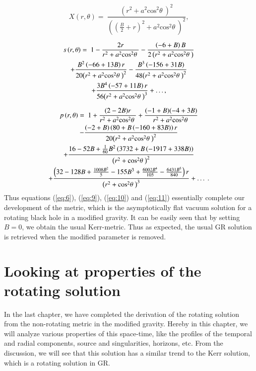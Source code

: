 \documentclass[12pt,a4paper,oneside]{book}
\newcommand{\eq}[2]{\begin{equation} \label{eq:#1} #2 \end{equation}}
\newcommand{\meq}[2]{\begin{multline}\label{eq:#1} #2 \end{multline}}
\newcommand{\Eref}[1]{(\ref{eq:#1})}
\begin{document}
\eq{9}{X\left(r,\theta \right)=\ \frac{{(r^2+a^2{{\mathrm{cos}}^{\mathrm{2}} \theta \ })}^2}{{\left({\left(\frac{B}{2}+r\right)}^2+a^2{{\mathrm{cos}}^{\mathrm{2}} \theta \ }\right)}^2},}

\meq{10}{s\left(r,\theta \right)=\ 1-\frac{2r}{r^2+a^2{{\mathrm{cos}}^{\mathrm{2}} \theta \ }}-\frac{\left(-6+B\right)B}{2\left(r^2+a^2{{\mathrm{cos}}^{\mathrm{2}} \theta \ }\right)}\cr+\frac{B^2\left(-66+13B\right)r}{20{\left(r^2+a^2{{\mathrm{cos}}^{\mathrm{2}} \theta \ }\right)}^2}
-\frac{B^3\left(-156+31B\right)}{48{\left(r^2+a^2{{\mathrm{cos}}^{\mathrm{2}} \theta \ }\right)}^2}\cr+\frac{3B^4\left(-57+11B\right)r}{56{\left(r^2+a^2{{\mathrm{cos}}^{\mathrm{2}} \theta \ }\right)}^3}+\dots,}

\meq{11}{p\left(r,\theta \right)=\ 1+\frac{(2-2B)r}{r^2+a^2{{\mathrm{cos}}^{\mathrm{2}} \theta \ }}+\frac{(-1+B)(-4+3B)}{r^2+a^2{{\mathrm{cos}}^{\mathrm{2}} \theta \ }}\cr-\frac{\left(-2+B\right)\left(80+B\left(-160+83B\right)\right)r}{20{\left(r^2+a^2{{\mathrm{cos}}^{\mathrm{2}} \theta \ }\right)}^2}
\cr+\frac{16-52B+\frac{1}{60}B^2\left(3732+B\left(-1917+338B\right)\right)}{{\left(r^2+{{\mathrm{cos}}^{\mathrm{2}} \theta \ }\right)}^2}
\cr+\frac{\left(32-128B+\frac{1008B^2}{5}-155B^3+\frac{6002B^4}{105}-\frac{6431B^5}{840}\right)r}{{\left(r^2+{{\mathrm{cos}}^{\mathrm{2}} \theta \ }\right)}^3}+\dots \ .}
Thus equations \Eref{6}, \Eref{9}, \Eref{10} and \Eref{11} essentially complete our development of the metric, which is the asymptotically flat vacuum solution for a rotating black hole in a modified gravity. It can be easily seen that by setting $B=0$, we obtain the usual Kerr-metric. Thus as expected, the usual GR solution is retrieved when the modified parameter is removed.
\chapter{Looking at properties of the rotating\label{Chap_Rot_Sol} solution}\label{Chap_Var_prop__rot}
In the last chapter, we have completed the derivation of the rotating solution from the non-rotating metric in the modified gravity. Hereby in this chapter, we will analyze various properties of this space-time, like the profiles of the temporal and radial components, source and singularities, horizons, etc. From the discussion, we will see that this solution has a similar trend to the Kerr solution, which is a rotating solution in GR.
\end{document}
